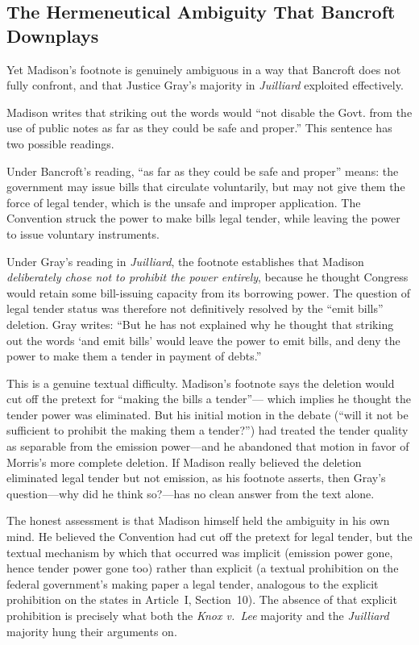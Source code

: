 \documentclass[12pt]{article}
\begin{document}
\subsection{The Hermeneutical Ambiguity That Bancroft Downplays}

Yet Madison's footnote is genuinely ambiguous in a way that Bancroft
does not fully confront, and that Justice Gray's majority in
\textit{Juilliard} exploited effectively.

Madison writes that striking out the words would ``not disable the
Govt. from the use of public notes as far as they could be safe and
proper.'' This sentence has two possible readings.

Under Bancroft's reading, ``as far as they could be safe and proper''
means: the government may issue bills that circulate voluntarily, but
may not give them the force of legal tender, which is the unsafe and
improper application. The Convention struck the power to make bills
legal tender, while leaving the power to issue voluntary instruments.

Under Gray's reading in \textit{Juilliard}, the footnote establishes
that Madison \textit{deliberately chose not to prohibit the power
entirely}, because he thought Congress would retain some bill-issuing
capacity from its borrowing power. The question of legal tender status
was therefore not definitively resolved by the ``emit bills'' deletion.
Gray writes: ``But he has not explained why he thought that striking
out the words `and emit bills' would leave the power to emit bills,
and deny the power to make them a tender in payment of debts.''

This is a genuine textual difficulty. Madison's footnote says the
deletion would cut off the pretext for ``making the bills a tender''---
which implies he thought the tender power was eliminated. But his
initial motion in the debate (``will it not be sufficient to prohibit
the making them a tender?'') had treated the tender quality as
separable from the emission power---and he abandoned that motion in
favor of Morris's more complete deletion. If Madison really believed
the deletion eliminated legal tender but not emission, as his footnote
asserts, then Gray's question---why did he think so?---has no clean
answer from the text alone.

The honest assessment is that Madison himself held the ambiguity in
his own mind. He believed the Convention had cut off the pretext for
legal tender, but the textual mechanism by which that occurred was
implicit (emission power gone, hence tender power gone too) rather
than explicit (a textual prohibition on the federal government's making
paper a legal tender, analogous to the explicit prohibition on the
states in Article~I, Section~10). The absence of that explicit
prohibition is precisely what both the \textit{Knox v.\ Lee} majority
and the \textit{Juilliard} majority hung their arguments on.
\end{document}
